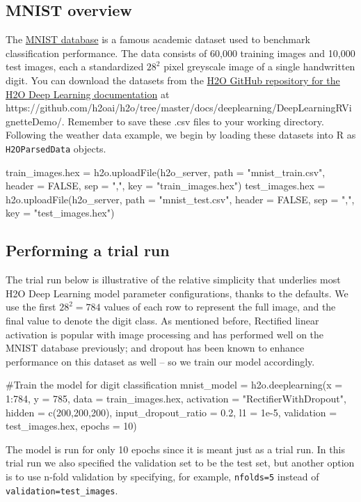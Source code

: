 \documentclass[11pt]{article}
\begin{document}
\subsection{MNIST overview} \label{3.1}

The \href{http://yann.lecun.com/exdb/mnist/}{MNIST database} is a famous academic dataset used to benchmark classification performance. The data consists of 60,000 training images and 10,000 test images, each a standardized $28^2$ pixel greyscale image of a single handwritten digit. You can download the datasets from the \href{https://github.com/h2oai/h2o/tree/master/docs/deeplearning/DeepLearningRVignetteDemo}{H2O GitHub repository for the H2O Deep Learning documentation} at \\https://github.com/h2oai/h2o/tree/master/docs/deeplearning/DeepLearningRVignetteDemo/. Remember to save these .csv files to your working directory. Following the weather data example, we begin by loading these datasets into R as \texttt{H2OParsedData} objects. 

\begin{spverbatim}
train_images.hex = h2o.uploadFile(h2o_server, path = "mnist_train.csv", header = FALSE, sep = ",", key = "train_images.hex")
test_images.hex = h2o.uploadFile(h2o_server, path = "mnist_test.csv", header = FALSE, sep = ",", key = "test_images.hex")
\end{spverbatim}


\subsection{Performing a trial run} \label{3.2}
The trial run below is illustrative of the relative simplicity that underlies most H2O Deep Learning model parameter configurations, thanks to the defaults. We use the first $28^2 = 784$ values of each row to represent the full image, and the final value to denote the digit class. As mentioned before, Rectified linear activation is popular with image processing and has performed well on the MNIST database previously; and dropout has been known to enhance performance on this dataset as well -- so we train our model accordingly. 
\begin{spverbatim}

#Train the model for digit classification
mnist_model = h2o.deeplearning(x = 1:784, y = 785, data = train_images.hex, activation = "RectifierWithDropout", hidden = c(200,200,200), input_dropout_ratio = 0.2, l1 = 1e-5, validation = test_images.hex, epochs = 10)

\end{spverbatim}
\noindent
The model is run for only 10 epochs since it is meant just as a trial run. In this trial run we also specified the validation set to be the test set, but another option is to use n-fold validation by specifying, for example, \texttt{nfolds=5} instead of \texttt{validation=test\_images}. 
\end{document}
